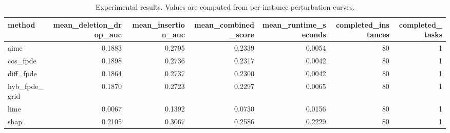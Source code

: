 \begin{table}[t]
\caption{Experimental results. Values are computed from per-instance perturbation curves.}
\label{tab:main_results_computed}
\centering
\begin{tabular}{lrrrrrr}
\toprule
method & mean\_deletion\_drop\_auc & mean\_insertion\_auc & mean\_combined\_score & mean\_runtime\_seconds & completed\_instances & completed\_tasks \\
\midrule
aime & 0.1883 & 0.2795 & 0.2339 & 0.0054 & 80 & 1 \\
cos\_fpde & 0.1898 & 0.2736 & 0.2317 & 0.0042 & 80 & 1 \\
diff\_fpde & 0.1864 & 0.2737 & 0.2300 & 0.0042 & 80 & 1 \\
hyb\_fpde\_grid & 0.1870 & 0.2723 & 0.2297 & 0.0065 & 80 & 1 \\
lime & 0.0067 & 0.1392 & 0.0730 & 0.0156 & 80 & 1 \\
shap & 0.2105 & 0.3067 & 0.2586 & 0.2229 & 80 & 1 \\
\bottomrule
\end{tabular}

\end{table}

